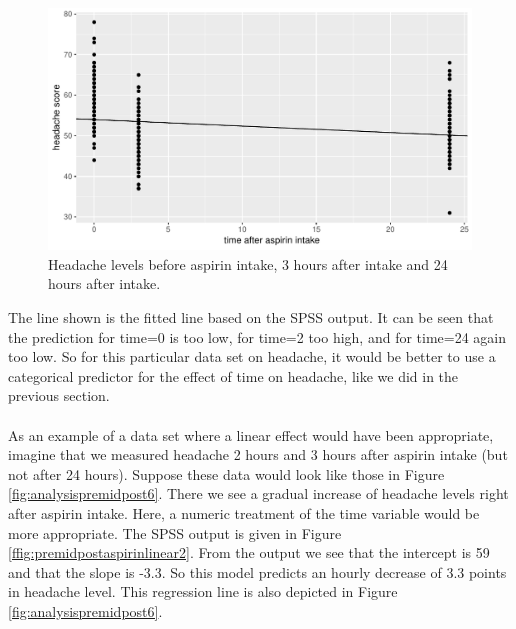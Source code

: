 \documentclass[]{report}\usepackage[]{graphicx}\usepackage[]{color}
\makeatletter
\def\maxwidth{ %
  \ifdim\Gin@nat@width>\linewidth
    \linewidth
  \else
    \Gin@nat@width
  \fi
}
\newenvironment{knitrout}{}{} %
\makeatother
\begin{document}
\begin{knitrout}
\color{fgcolor}\begin{figure}

{\centering \includegraphics[width=\maxwidth]{figure/analysispremidpost5-1} 

}

\caption[Headache levels before aspirin intake, 3 hours after intake and 24 hours after intake]{Headache levels before aspirin intake, 3 hours after intake and 24 hours after intake.}\label{fig:analysispremidpost5}
\end{figure}


\end{knitrout}

The line shown is the fitted line based on the SPSS output. It can be seen that the prediction for time=0 is too low, for time=2 too high, and for time=24 again too low. So for this particular data set on headache, it would be better to use a categorical predictor for the effect of time on headache, like we did in the previous section.
\\
\\
As an example of a data set where a linear effect would have been appropriate, imagine that we measured headache 2 hours and 3 hours after aspirin intake (but not after 24 hours). Suppose these data would look like those in Figure \ref{fig:analysispremidpost6}. There we see a gradual increase of headache levels right after aspirin intake. Here, a numeric treatment of the time variable would be more appropriate. The SPSS output is given in Figure \ref{ffig:premidpostaspirinlinear2}. From the output we see that the intercept is 59 and that the slope is -3.3. So this model predicts an hourly decrease of 3.3 points in headache level. This regression line is also depicted in Figure \ref{fig:analysispremidpost6}. 
\end{document}
